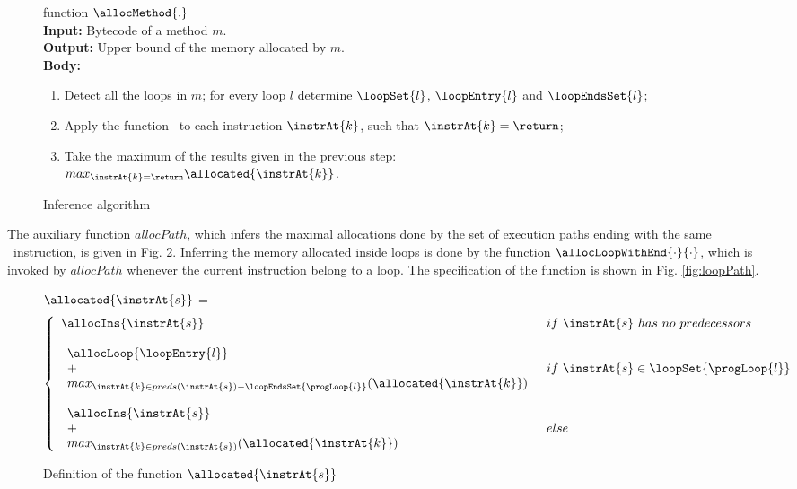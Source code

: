 \begin{figure}[!htp]
function $\allocMethod{.}$\\
\textbf{Input:} Bytecode of a method $m$. \\
\textbf{Output:} Upper bound of the memory allocated by $m$. \\
\textbf{Body:}
\begin{enumerate}
   \item Detect all the loops in $m$; for every loop $l$ determine $\loopSet{l}$, $\loopEntry{l}$ and $\loopEndsSet{l}$;
   \item Apply the function \allocatedOnly \  to each instruction $\instrAt{k}$, such that $\instrAt{k} = \return$;
   \item Take the maximum of the results given in the previous step: \\
 $max_{\instrAt{k} = \return } \allocated{\instrAt{k}}$.
\end{enumerate}
\caption{\sc Inference algorithm}
\label{methodAlloc}
\end{figure}

The auxiliary function $allocPath$, which infers the maximal allocations done by the set of execution paths ending with the same \return\ instruction,
 is given in Fig. \ref{fig:allocMethod}.
Inferring the memory allocated inside loops is done by the function $\allocLoopWithEnd{\cdot}{\cdot}$, which is invoked by $allocPath$ whenever the 
current instruction belong to a loop. The specification of the function is shown in Fig. \ref{fig:loopPath}.

\begin{figure}[!hbp]
$\allocated{\instrAt{s}}$ = 
$$ \left\{ \begin{array}{ll}
\allocIns{\instrAt{s} }   &  if \ \instrAt{s} \ has \ no \ predecessors \\
& \\
  \begin{array}{l}
            \allocLoop{\loopEntry{l}} \\
             + \\
            max_{\instrAt{k} \in preds(\instrAt{s} )-\loopEndsSet{\progLoop{l}}}( \allocated{\instrAt{k}} ) \\
                   \end{array}      & if \  \instrAt{s} \in \loopSet{\progLoop{l}} \\
& \\
\begin{array}{l}
\allocIns{\instrAt{s}} \\
 + \\
max_{\instrAt{k} \in preds(\instrAt{s} )}
 ( \allocated{\instrAt{k}} )
                       \end{array} & else 
\end{array}
\right.
$$
\caption{\sc Definition of the function $\allocated{\instrAt{s}}$} 
\label{fig:allocMethod}
\end{figure}


